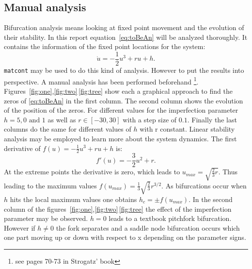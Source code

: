 \subsection{Manual analysis}
Bifurcation analysis means looking at fixed point movement and the evolution of their stability. In this report equation~\ref{eq:toBeAn} will be analyzed thoroughly. It contains the information of the fixed point locations for the system:
\begin{equation}
\dot{u} = -\frac{1}{2} u^3 + ru + h. 
\label{eq:sys} 
\end{equation}
\texttt{matcont} may be used to do this kind of analysis. However to put the results into perspective. A manual analysis has been performed beforehand \footnote{see pages 70-73 in Strogatz' book}. Figures~\ref{fig:one},\ref{fig:two}\,\ref{fig:tree} show each a graphical approach to find the zeros of \ref{eq:toBeAn} in the first column. The second column shows the evolution of the position of the zeros. For different values for the imperfection parameter $h = 5,0 \text{ and } 1$ as well as $r \in [-30,30]$ with a step size of $0.1$. Finally the last columns do the same for different values of $h$ with r constant.
Linear stability analysis may be employed to learn more about the system dynamics. The first derivative of $f(u) = -\frac{1}{2} u^3 + ru + h$ is: 
\begin{equation}
f'(u) = -\frac{3}{2}u^2 + r.
\end{equation}
At the extreme points the derivative is zero, which leads to $u_{max} = \sqrt{\frac{2}{3}r}$. Thus leading to the maximum values $f(u_{max})= \frac{1}{3} \sqrt{\frac{2}{3}}r^{3/2}$. As bifurcations occur when $h$ hits the local maximum values one obtains $h_c = \pm f(u_{max})$. In the second column of the figures~\ref{fig:one},\ref{fig:two}\,\ref{fig:tree} the effect of the imperfection parameter may be observed. $h = 0$ leads to a textbook pitchfork bifurcation. However if $h \ne 0$ the fork separates and a saddle node bifurcation occurs which one part moving up or down with respect to x depending on the parameter signs.
